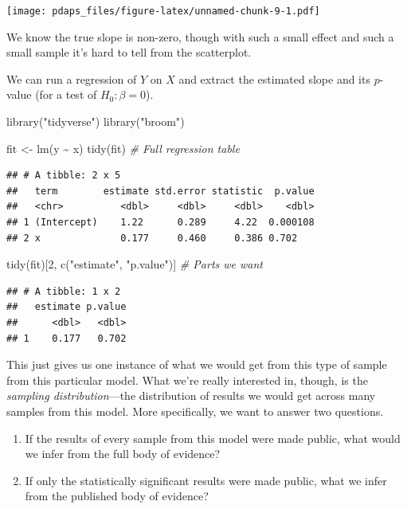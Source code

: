 \documentclass[
  12pt,
  oneside,openany]{book}
\newenvironment{Shaded}{\begin{snugshade}}{\end{snugshade}}
\newcommand{\CommentTok}[1]{\textcolor[rgb]{0.56,0.35,0.01}{\textit{#1}}}
\newcommand{\DecValTok}[1]{\textcolor[rgb]{0.00,0.00,0.81}{#1}}
\newcommand{\FunctionTok}[1]{\textcolor[rgb]{0.00,0.00,0.00}{#1}}
\newcommand{\NormalTok}[1]{#1}
\newcommand{\OtherTok}[1]{\textcolor[rgb]{0.56,0.35,0.01}{#1}}
\newcommand{\SpecialCharTok}[1]{\textcolor[rgb]{0.00,0.00,0.00}{#1}}
\newcommand{\StringTok}[1]{\textcolor[rgb]{0.31,0.60,0.02}{#1}}
\begin{document}
\texttt{[image: pdaps\_files/figure-latex/unnamed-chunk-9-1.pdf]}

We know the true slope is non-zero, though with such a small effect and such a small sample it's hard to tell from the scatterplot.

We can run a regression of \(Y\) on \(X\) and extract the estimated slope and its \(p\)-value (for a test of \(H_0 : \beta = 0\)).

\begin{Shaded}
\begin{Highlighting}[]
\FunctionTok{library}\NormalTok{(}\StringTok{"tidyverse"}\NormalTok{)}
\FunctionTok{library}\NormalTok{(}\StringTok{"broom"}\NormalTok{)}

\NormalTok{fit }\OtherTok{\textless{}{-}} \FunctionTok{lm}\NormalTok{(y }\SpecialCharTok{\textasciitilde{}}\NormalTok{ x)}
\FunctionTok{tidy}\NormalTok{(fit)  }\CommentTok{\# Full regression table}
\end{Highlighting}
\end{Shaded}

\begin{verbatim}
## # A tibble: 2 x 5
##   term        estimate std.error statistic  p.value
##   <chr>          <dbl>     <dbl>     <dbl>    <dbl>
## 1 (Intercept)    1.22      0.289     4.22  0.000108
## 2 x              0.177     0.460     0.386 0.702
\end{verbatim}

\begin{Shaded}
\begin{Highlighting}[]
\FunctionTok{tidy}\NormalTok{(fit)[}\DecValTok{2}\NormalTok{, }\FunctionTok{c}\NormalTok{(}\StringTok{"estimate"}\NormalTok{, }\StringTok{"p.value"}\NormalTok{)]  }\CommentTok{\# Parts we want}
\end{Highlighting}
\end{Shaded}

\begin{verbatim}
## # A tibble: 1 x 2
##   estimate p.value
##      <dbl>   <dbl>
## 1    0.177   0.702
\end{verbatim}

This just gives us one instance of what we would get from this type of sample from this particular model. What we're really interested in, though, is the \emph{sampling distribution}---the distribution of results we would get across many samples from this model. More specifically, we want to answer two questions.

\begin{enumerate}
\def\labelenumi{\arabic{enumi}.}
\item
  If the results of every sample from this model were made public, what would we infer from the full body of evidence?
\item
  If only the statistically significant results were made public, what we infer from the published body of evidence?
\end{enumerate}
\end{document}
